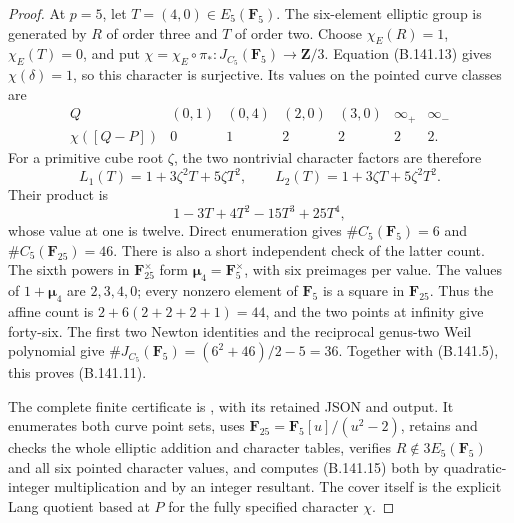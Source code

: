 \begin{proof}
At $p=5$, let $T=(4,0)\in E_5(\mathbf F_5)$.
The six-element elliptic group is generated by $R$ of order
three and $T$ of order two.
Choose $\chi_E(R)=1$, $\chi_E(T)=0$, and put
$\chi=\chi_E\circ\pi_*:J_{C_5}(\mathbf F_5)\to\mathbf Z/3$.
Equation (B.141.13) gives $\chi(\delta)=1$, so this character is
surjective.  Its values on the pointed curve classes are
\[
\begin{array}{c|rrrrrr}
 Q&(0,1)&(0,4)&(2,0)&(3,0)&\infty_+&\infty_-\\ \hline
 \chi([Q-P])&0&1&2&2&2&2 .
\end{array}                                                  \tag{B.141.14}
\]
For a primitive cube root $\zeta$, the two nontrivial character
factors are therefore
\[
  L_1(T)=1+3\zeta^2T+5\zeta T^2,\qquad
  L_2(T)=1+3\zeta T+5\zeta^2T^2.
\]
Their product is
\[
             1-3T+4T^2-15T^3+25T^4 ,
                                                            \tag{B.141.15}
\]
whose value at one is twelve.
Direct enumeration gives
$\#C_5(\mathbf F_5)=6$ and $\#C_5(\mathbf F_{25})=46$.
There is also a short independent check of the latter count.
The sixth powers in $\mathbf F_{25}^{\times}$ form
$\boldsymbol\mu_4=\mathbf F_5^\times$, with six preimages
per value.  The values of $1+\boldsymbol\mu_4$ are
$2,3,4,0$; every nonzero element of $\mathbf F_5$ is a
square in $\mathbf F_{25}$.
Thus the affine count is $2+6(2+2+2+1)=44$, and the two
points at infinity give forty-six.
The first two Newton identities and the reciprocal genus-two
Weil polynomial give
$\#J_{C_5}(\mathbf F_5)=(6^2+46)/2-5=36$.
Together with (B.141.5), this proves (B.141.11).

The complete finite certificate is
, with its
retained JSON and output.
It enumerates both curve point sets, uses
$\mathbf F_{25}=\mathbf F_5[u]/(u^2-2)$, retains and checks the
whole elliptic addition and character tables, verifies
$R\notin3E_5(\mathbf F_5)$ and all six pointed character values,
and computes (B.141.15) both by quadratic-integer multiplication
and by an integer resultant.
The cover itself is the explicit Lang quotient based at $P$
for the fully specified character $\chi$.
\end{proof}


